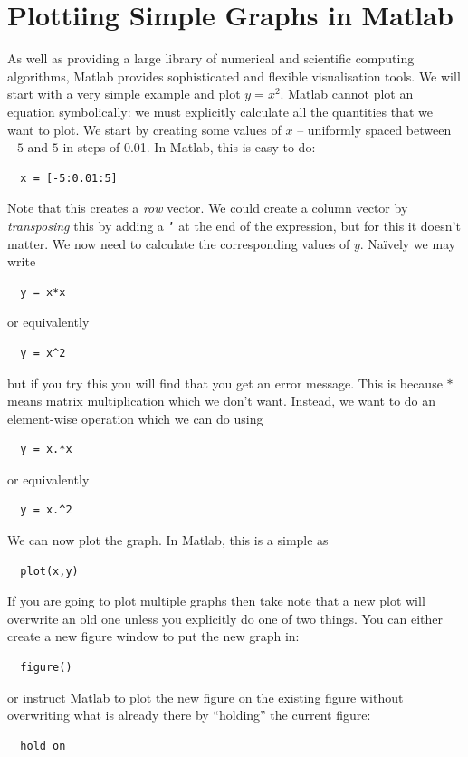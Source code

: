 \documentclass[12pt,a4paper]{tufte-handout}
\begin{document}
\section{Plottiing Simple Graphs in Matlab}
As well as providing a large library of numerical and scientific computing algorithms, Matlab provides sophisticated and flexible visualisation tools. We will start with a very simple example and plot $y=x^2$. Matlab cannot plot an equation symbolically: we must explicitly calculate all the quantities that we want to plot. We start by creating some values of $x$ -- uniformly spaced between $-5$ and $5$ in steps of 0.01. In Matlab, this is easy to do:
\begin{lstlisting}
  x = [-5:0.01:5]
\end{lstlisting}
Note that this creates a \textit{row} vector. We could create a column vector by \textit{transposing} this by adding a \texttt{'} at the end of the expression, but for this it doesn't matter. We now need to calculate the corresponding values of $y$. Na\"ively we may write
\begin{lstlisting}
  y = x*x
\end{lstlisting}
or equivalently
\begin{lstlisting}
  y = x^2
\end{lstlisting}
but if you try this you will find that you get an error message. This is because $*$ means matrix multiplication which we don't want. Instead, we want to do an element-wise operation which we can do using
\begin{lstlisting}
  y = x.*x
\end{lstlisting}
or equivalently
\begin{lstlisting}
  y = x.^2
\end{lstlisting}
We can now plot the graph. In Matlab, this is a simple as
\begin{lstlisting}
  plot(x,y)
\end{lstlisting}
If you are going to plot multiple graphs then take note that a new plot will overwrite an old one unless you explicitly do one of two things. You can either create a new figure window to put the new graph in:
\begin{lstlisting}
  figure()
\end{lstlisting}
or instruct Matlab to plot the new figure on the existing figure without overwriting what is already there by ``holding'' the current figure:
\begin{lstlisting}
  hold on
\end{lstlisting}
\end{document}
